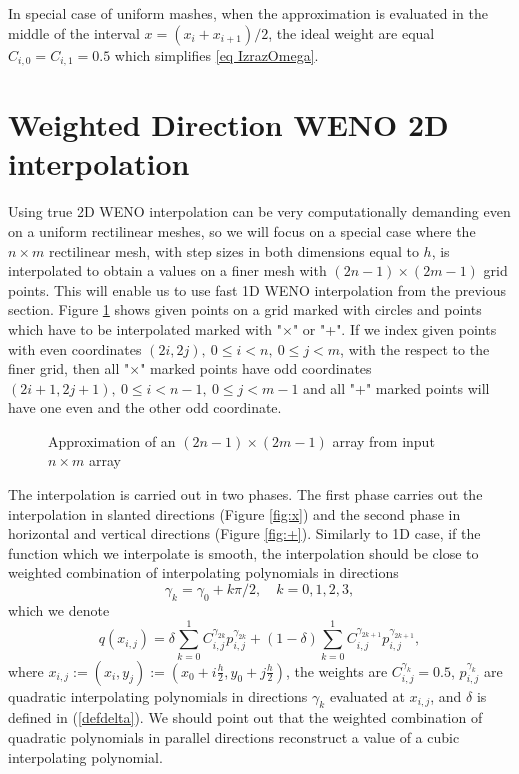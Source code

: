 	In special case of uniform mashes, when the approximation is evaluated in the middle of the interval $x=(x_i+x_{i+1})/2$, the ideal weight are equal $C_{i,0}=C_{i,1}=0.5$ which simplifies \eqref{eq IzrazOmega}.
	
	\section{{Weighted Direction WENO 2D}  interpolation }\label{sed: 2D WENO}
	Using true 2D WENO interpolation can be very computationally demanding even on a uniform rectilinear meshes, so we will focus on a special case where the $n\times m$ rectilinear mesh, with step sizes in both dimensions equal to $h$, is interpolated to obtain a values on a finer mesh with $(2n-1)\times (2m-1)$ grid points. This will enable us to use fast 1D WENO interpolation from the previous section. Figure \ref{fig:inputdata} shows given points on a grid marked with circles and points which have to be interpolated marked with "$\times$" or "+". If we index given points with even coordinates $(2i,2j),\ 0\leq i<n,\ 0\leq j<m$, with the respect to the finer grid, then all "$\times$" marked points have odd coordinates $(2i+1,2j+1),\ 0\leq i<n-1,\ 0\leq j<m-1$ and all "+" marked points will have one even and the other odd coordinate.
	

	\begin{figure}
		\begin{center}
			\caption{Approximation of an $(2n-1)\times(2m-1)$ array from input $n\times m$ array }
			\label{fig:inputdata}
		\end{center}
	\end{figure}	
	
	The interpolation is carried out in two phases. 
	The first phase carries out the interpolation in slanted directions (Figure \ref{fig:x}) and the second phase in horizontal and vertical directions (Figure \ref{fig:+}). Similarly to 1D case, if the function which we interpolate is smooth, the interpolation should be close to weighted combination of interpolating polynomials
	in directions 
	\begin{equation} \label{defgammak}
		\gamma_k=\gamma_0+k\pi/2, \quad k=0,1,2,3,
	\end{equation}
	which we denote
	\begin{equation}\label{eq: Ideal2DPolynomial}
		q(x_{i,j})=\delta\sum_{k=0}^1 C_{i,j}^{\gamma_{2k}} p_{i,j}^{\gamma_{2k}}+(1-\delta)\sum_{k=0}^1 C_{i,j}^{\gamma_{2k+1}} p_{i,j}^{\gamma_{2k+1}},
	\end{equation}
	where $x_{i,j}:=(x_i,y_j):=\left(x_0+i\frac{h}{2},y_0+j\frac{h}{2}\right)$, the weights are $C^{\gamma_{k}}_{i,j}=0.5$, $p_{i,j}^{\gamma_{k}}$ are quadratic interpolating polynomials in directions ${\gamma_{k}}$ evaluated at $x_{i,j}$, and $\delta$ is defined in (\ref{defdelta}). We should point out that the weighted combination of quadratic polynomials in parallel directions reconstruct a value of a cubic interpolating polynomial.
	
